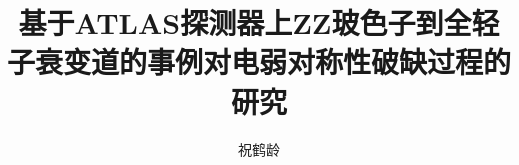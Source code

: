 \documentclass[doctor,english,pdf]{ustcthesis}
\title{基于ATLAS探测器上ZZ玻色子到全轻子衰变道的事例对电弱对称性破缺过程的研究}
\author{祝鹤龄}
\begin{document}
\maketitle

\frontmatter
\linenumbers


\tableofcontents
\listoffigures
\listoftables

\makededicate
\newpage

\mainmatter










\appendix
%

\backmatter
%
\end{document}
